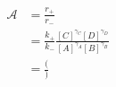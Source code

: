 \begin{eqnarray}\label{eqn:reaction-affinity-ratio}
\mathcal{A} &= \frac{r_+}{r_-} \\
& = \frac{k_+}{k_-}\frac{[C]^{\gamma_C}[D]^{\gamma_D}}{[A]^{\gamma_A}[B]^{\gamma_B}} \\
& = \frac()
\end{eqnarray}